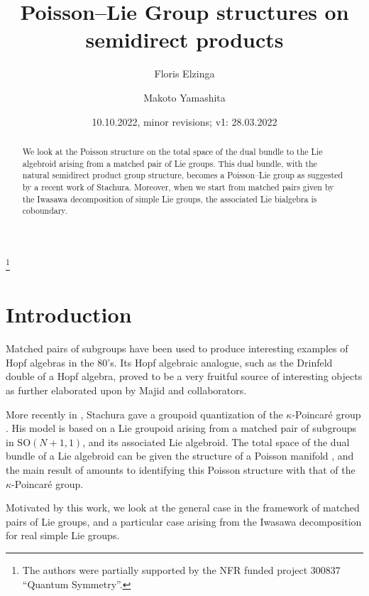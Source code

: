 \documentclass[a4paper,11pt]{amsart}
\newcommand{\SO}{\mathrm{SO}}
\theoremstyle{definition}
\theoremstyle{remark}
\begin{document}
\title{Poisson--Lie Group structures on semidirect products}

\author{Floris Elzinga}
\address{Department of Mathematics, University of Oslo, P.O.\ box 1053, Blindern, 0316 Oslo, Norway}

\author{Makoto Yamashita}

\thanks{The authors were partially supported by the NFR funded project 300837 ``Quantum Symmetry''.}

\date{10.10.2022, minor revisions; v1: 28.03.2022}

\begin{abstract}
We look at the Poisson structure on the total space of the dual bundle to the Lie algebroid arising from a matched pair of Lie groups.
This dual bundle, with the natural semidirect product group structure, becomes a Poisson--Lie group as suggested by a recent work of Stachura.
Moreover, when we start from matched pairs given by the Iwasawa decomposition of simple Lie groups, the associated Lie bialgebra is coboundary.
\end{abstract}

\maketitle

\section{Introduction}

Matched pairs of subgroups have been used to produce interesting examples of Hopf algebras \cite{MR611561} in the 80's.
Its Hopf algebraic analogue, such as the Drinfeld double of a Hopf algebra, proved to be a very fruitful source of interesting objects as further elaborated upon by Majid \cite{MR1045735} and collaborators.

More recently in , Stachura gave a groupoid quantization of the $\kappa$-Poincaré group \cite{MR1280372}.
His model is based on a Lie groupoid arising from a matched pair of subgroups in $\SO(N+1,1)$, and its associated Lie algebroid. 
The total space of the dual bundle of a Lie algebroid can be given the structure of a Poisson manifold \cite{MR998124}, and the main result of \cite{MR3681683} amounts to identifying this Poisson structure with that of the $\kappa$-Poincaré group.

Motivated by this work, we look at the general case in the framework of matched pairs of Lie groups, and a particular case arising from the Iwasawa decomposition for real simple Lie groups.
\end{document}
